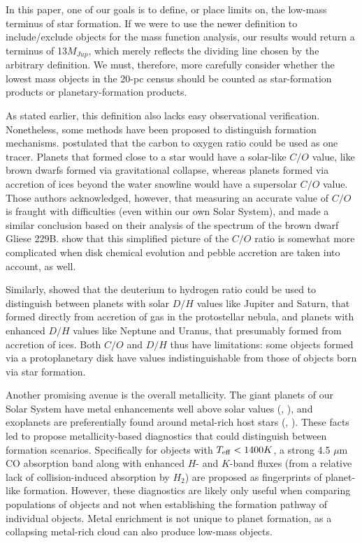 \documentclass[twocolumn,tighten,twocolappendix]{aastex631}
\begin{document}
In this paper, one of our goals is to define, or place limits on, the low-mass terminus of star formation. If we were to use the newer definition to include/exclude objects for the mass function analysis, our results would return a terminus of 13$M_{Jup}$, which merely reflects the dividing line chosen by the arbitrary definition. We must, therefore, more carefully consider whether the lowest mass objects in the 20-pc census should be counted as star-formation products or planetary-formation products.

As stated earlier, this definition also lacks easy observational verification. Nonetheless, some methods have been proposed to distinguish formation mechanisms. \cite{oberg2011} postulated that the carbon to oxygen ratio could be used as one tracer. Planets that formed close to a star would have a solar-like $C/O$ value, like brown dwarfs formed via gravitational collapse, whereas planets formed via accretion of ices beyond the water snowline would have a supersolar $C/O$ value. Those authors acknowledged, however, that measuring an accurate value of $C/O$ is fraught with difficulties (even within our own Solar System), and \cite{calamari2022} made a similar conclusion based on their analysis of the spectrum of the brown dwarf Gliese 229B. \cite{molliere2022} show that this simplified picture of the $C/O$ ratio is somewhat more complicated when disk chemical evolution and pebble accretion are taken into account, as well.

Similarly, \cite{morley2019} showed that the deuterium to hydrogen ratio could be used to distinguish between planets with solar $D/H$ values like Jupiter and Saturn, that formed directly from accretion of gas in the protostellar nebula, and planets with enhanced $D/H$ values like Neptune and Uranus, that presumably formed from accretion of ices. Both $C/O$ and $D/H$ thus have limitations: some objects formed via a protoplanetary disk have values indistinguishable from those of objects born via star formation. 

Another promising avenue is the overall metallicity. The giant planets of our Solar System have metal enhancements well above solar values (\citealt{wong2004}, \citealt{fletcher2009}), and exoplanets are preferentially found around metal-rich host stars (\citealt{fischer2005}, \citealt{wang2015}). These facts led \cite{fortney2008} to propose metallicity-based diagnostics that could distinguish between formation scenarios. Specifically for objects with $T_{\rm eff} < 1400K$, a strong 4.5 $\mu$m CO absorption band along with enhanced $H$- and $K$-band fluxes (from a relative lack of collision-induced absorption by $H_2$) are proposed as fingerprints of planet-like formation. However, these diagnostics are likely only useful when comparing populations of objects and not when establishing the formation pathway of individual objects. Metal enrichment is not unique to planet formation, as a collapsing metal-rich cloud can also produce low-mass objects.
\end{document}
